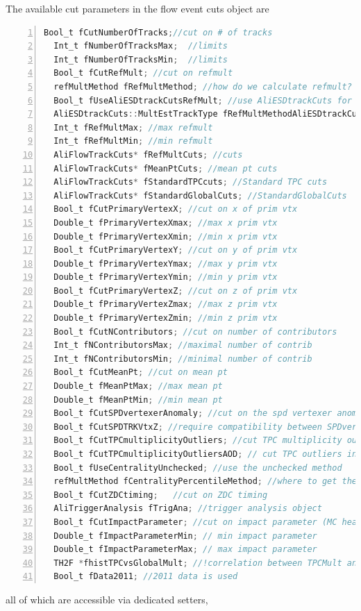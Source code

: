\documentclass[a4paper]{book}
\numberwithin{equation}{subsection}
\begin{document}
  The available cut parameters in the flow event cuts object are
\begin{lstlisting}[language=C, numbers=left]
  Bool_t fCutNumberOfTracks;//cut on # of tracks
  Int_t fNumberOfTracksMax;  //limits
  Int_t fNumberOfTracksMin;  //limits
  Bool_t fCutRefMult; //cut on refmult
  refMultMethod fRefMultMethod; //how do we calculate refmult?
  Bool_t fUseAliESDtrackCutsRefMult; //use AliESDtrackCuts for refmult calculation
  AliESDtrackCuts::MultEstTrackType fRefMultMethodAliESDtrackCuts;
  Int_t fRefMultMax; //max refmult
  Int_t fRefMultMin; //min refmult
  AliFlowTrackCuts* fRefMultCuts; //cuts
  AliFlowTrackCuts* fMeanPtCuts; //mean pt cuts
  AliFlowTrackCuts* fStandardTPCcuts; //Standard TPC cuts
  AliFlowTrackCuts* fStandardGlobalCuts; //StandardGlobalCuts
  Bool_t fCutPrimaryVertexX; //cut on x of prim vtx
  Double_t fPrimaryVertexXmax; //max x prim vtx
  Double_t fPrimaryVertexXmin; //min x prim vtx
  Bool_t fCutPrimaryVertexY; //cut on y of prim vtx
  Double_t fPrimaryVertexYmax; //max y prim vtx
  Double_t fPrimaryVertexYmin; //min y prim vtx
  Bool_t fCutPrimaryVertexZ; //cut on z of prim vtx
  Double_t fPrimaryVertexZmax; //max z prim vtx
  Double_t fPrimaryVertexZmin; //min z prim vtx
  Bool_t fCutNContributors; //cut on number of contributors
  Int_t fNContributorsMax; //maximal number of contrib
  Int_t fNContributorsMin; //minimal number of contrib
  Bool_t fCutMeanPt; //cut on mean pt
  Double_t fMeanPtMax; //max mean pt
  Double_t fMeanPtMin; //min mean pt
  Bool_t fCutSPDvertexerAnomaly; //cut on the spd vertexer anomaly
  Bool_t fCutSPDTRKVtxZ; //require compatibility between SPDvertexz TRKvertexz
  Bool_t fCutTPCmultiplicityOutliers; //cut TPC multiplicity outliers
  Bool_t fCutTPCmultiplicityOutliersAOD; // cut TPC outliers in 10h or 11h aod
  Bool_t fUseCentralityUnchecked; //use the unchecked method
  refMultMethod fCentralityPercentileMethod; //where to get the percentile from
  Bool_t fCutZDCtiming;   //cut on ZDC timing
  AliTriggerAnalysis fTrigAna; //trigger analysis object
  Bool_t fCutImpactParameter; //cut on impact parameter (MC header)
  Double_t fImpactParameterMin; // min impact parameter
  Double_t fImpactParameterMax; // max impact parameter
  TH2F *fhistTPCvsGlobalMult; //!correlation between TPCMult and GlobalMult
  Bool_t fData2011; //2011 data is used\end{lstlisting}
  all of which are accessible via dedicated setters,
\end{document}
